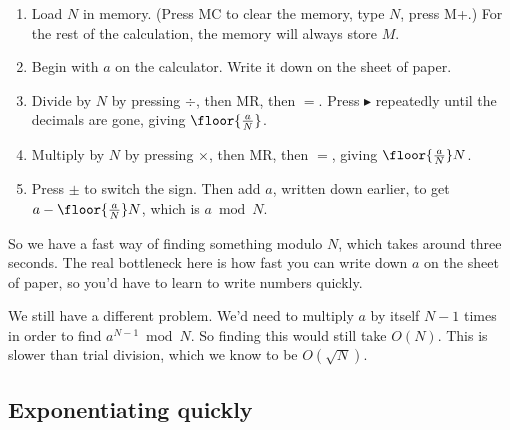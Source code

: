 \documentclass[11pt,paper=letter]{scrartcl}
\begin{document}

\begin{enumerate}
  \item Load $N$ in memory. (Press MC to clear the memory, type $N$, press M+.) For the rest of the calculation, the memory will always store $M$.
  \item Begin with $a$ on the calculator. Write it down on the sheet of paper.
  \item Divide by $N$ by pressing $\div$, then MR, then $=$. Press $\blacktriangleright$ repeatedly until the decimals are gone, giving $\floor{\frac{a}{N}}$.
  \item Multiply by $N$ by pressing $\times$, then MR, then $=$, giving $\floor{\frac{a}{N}}N$.
  \item Press $\pm$ to switch the sign. Then add $a$, written down earlier, to get $a - \floor{\frac{a}{N}}N$, which is $a \bmod N$.
\end{enumerate}




So we have a fast way of finding something modulo $N$, which takes around three seconds. The real bottleneck here is how fast you can write down $a$ on the sheet of paper, so you'd have to learn to write numbers quickly.

We still have a different problem. We'd need to multiply $a$ by itself $N-1$ times in order to find $a^{N-1} \bmod N$. So finding this would still take $O(N)$. This is slower than trial division, which we know to be $O(\sqrt{N})$.

\subsection{Exponentiating quickly}
\end{document}
